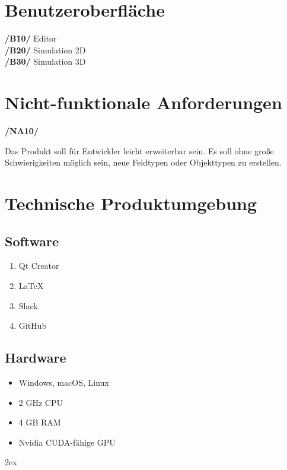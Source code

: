 \documentclass[11pt,a4paper]{article}
\begin{document}
	\section{Benutzeroberfläche}
	\noindent\large\textbf{/B10/} Editor
	\normalsize \\
	\noindent\large\textbf{/B20/} Simulation 2D
	\normalsize \\
	\noindent\large\textbf{/B30/} Simulation 3D
	\normalsize \\

	\section{Nicht-funktionale Anforderungen}
	\noindent\large\textbf{/NA10/}
	\normalsize \\
	\begin{addmargin}{0.1 \textwidth}
		Das Produkt soll für Entwickler leicht erweiterbar sein. Es soll ohne große Schwierigkeiten möglich sein, neue Feldtypen oder Objekttypen zu erstellen.\\
	\end{addmargin}

	\section{Technische Produktumgebung}
	\subsection{Software}
		\begin{enumerate}
			\item Qt Creator
			\item LaTeX
			\item Slack
			\item GitHub
		\end{enumerate}
	\subsection{Hardware}
		\begin{itemize}
			\item Windows, macOS, Linux
			\item 2 GHz CPU
			\item 4 GB RAM
			\item Nvidia CUDA-fähige GPU
		\end{itemize}
	
	\pagebreak	
	\renewcommand{\notesname}{\section{Glossar}}
	\begingroup
	\parindent 0pt
	\parskip 2ex
	\def\enotesize{\normalsize}
	\theendnotes
	\endgroup
	
\end{document}

